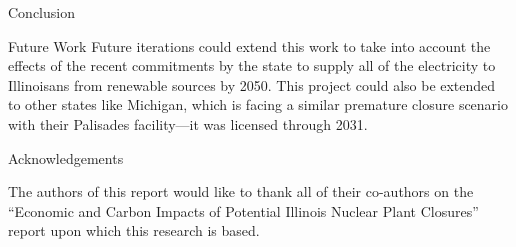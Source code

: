 \documentclass[final]{beamer}
\newlength{\onecolwid}
\newlength{\threecolwid}
\begin{document}
\begin{frame}[t]
\begin{columns}[t,totalwidth=\threecolwid]
\begin{column}{\onecolwid}
\begin{block}{Conclusion}
\end{block}

\begin{alertblock}{Future Work }
	Future iterations could extend this work to take into account the effects of the recent commitments by the state to supply all of the electricity to Illinoisans from renewable sources by 2050.
	This project could also be extended to other states like Michigan, which is facing a similar premature closure scenario with their Palisades facility---it was licensed through 2031.

\end{alertblock}




\begin{block}{Acknowledgements}

	The authors of this report would like to thank all of their co-authors on the “Economic and Carbon Impacts of Potential Illinois Nuclear Plant Closures” report upon which this research is based.

\end{block}





\end{column}
\end{columns}
\end{frame}
\end{document}

